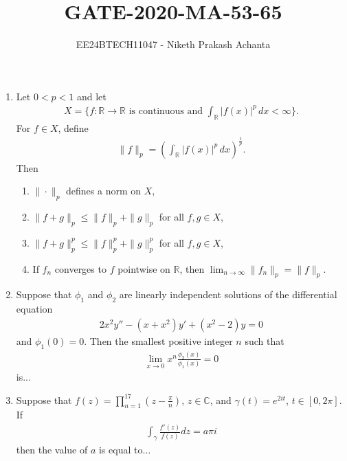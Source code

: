 \documentclass[journal]{IEEEtran}
\numberwithin{equation}{enumi}
\numberwithin{figure}{enumi}
\begin{document}


\title{GATE-2020-MA-53-65}
\author{EE24BTECH11047 - Niketh Prakash Achanta}
\maketitle

\begin{enumerate}[start=53]
\item Let \(0 < p < 1\) and let 
\begin{align*}
    X = \{ f : \mathbb{R} \rightarrow \mathbb{R} \text{ is continuous and } \int_{\mathbb{R}} |f(x)|^p \, dx < \infty \}.
\end{align*}
For \(f \in X\), define 
\begin{align*}
   \|f\|_p = \left(\int_{\mathbb{R}} |f(x)|^p \, dx\right)^{\frac{1}{p}}. 
\end{align*}
Then 
\begin{enumerate}
    \item \(\|\cdot\|_p\) defines a norm on \(X\),
    \item \(\|f + g\|_p \leq \|f\|_p + \|g\|_p\) for all \(f, g \in X\),
    \item \(\|f + g\|_p^p \leq \|f\|_p^p + \|g\|_p^p\) for all \(f, g \in X\),
    \item If \(f_n\) converges to \(f\) pointwise on \(\mathbb{R}\), then \(\lim_{n \rightarrow \infty} \|f_n\|_p = \|f\|_p\).
\end{enumerate}

\item Suppose that \(\phi_1\) and \(\phi_2\) are linearly independent solutions of the differential equation
\begin{align*}
   2x^2y'' - (x + x^2)y' + (x^2 - 2)y = 0 
\end{align*}
and \(\phi_1(0) = 0\). Then the smallest positive integer \(n\) such that
\begin{align*}
    \lim_{x \rightarrow 0} x^n \frac{\phi_2(x)}{\phi_1(x)} = 0
\end{align*}
is...

\item Suppose that \(f(z) = \prod_{n=1}^{17} (z - \frac{\pi}{n})\), \(z \in \mathbb{C}\), and \(\gamma(t) = e^{2it}\), \(t \in [0, 2\pi]\). If
\begin{align*}
\int_{\gamma} \frac{f'(z)}{f(z)} dz = a\pi i    
\end{align*}
then the value of \(a\) is equal to...


\end{enumerate}
\end{document}
